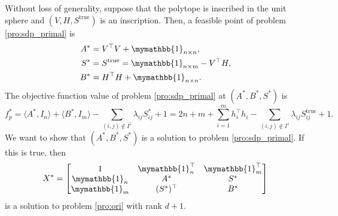 \documentclass[smallextended, envcountsame]{svjour3}
\begin{document}
    Without loss of generality, suppose that the polytope is inscribed in the unit sphere and $(V,H,S^{\mathrm{true}})$ is an inscription.  Then, a feasible point of problem \eqref{pro:sdp_primal} is
    \begin{align}\label{eqs:ABS}
    \begin{split}
        A^*&=V^\top V+\mymathbb{1}_{n\times n},\\
        S^*&=S^{\mathrm{true}}=\mymathbb{1}_{n\times m}-V^\top H,\\
        B^*&=H^\top H+\mymathbb{1}_{n\times n}.
    \end{split}
    \end{align}
    The objective function value of problem \eqref{pro:sdp_primal} at $(A^*,B^*,S^*)$ is
    \begin{equation*}
        f_p^*  = \langle A^*, I_n\rangle + \langle B^*, I_m\rangle - \sum_{(i,j)\notin I^z}\lambda_{ij}S^*_{ij} + 1 = 2n+m+\sum\limits_{i=1}^mh_i^\top h_i-\sum_{(i,j)\notin I^z}\lambda_{ij}S^{\mathrm{true}}_{ij} + 1.
    \end{equation*}
    We want to show that $(A^*,B^*,S^*)$ is a solution to problem \eqref{pro:sdp_primal}.  If this is true, then \begin{equation*}
        X^*=\begin{bmatrix}
            1 & \mymathbb{1}_n^\top & \mymathbb{1}_m^\top\\
            \mymathbb{1}_n & A^* & S^*\\
            \mymathbb{1}_m & (S^*)^\top & B^*
        \end{bmatrix}
    \end{equation*}
    is a solution to problem \eqref{pro:ori} with rank $d+1$.
\end{document}
